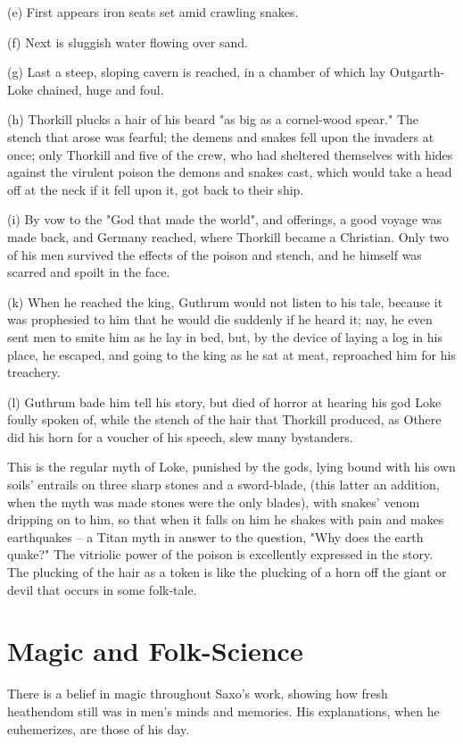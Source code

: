 \documentclass[10pt,a4paper]{report}
\begin{document}
(e) First appears iron seats set amid crawling snakes.

(f) Next is sluggish water flowing over sand.

(g) Last a steep, sloping cavern is reached, in a chamber of which lay Outgarth-Loke chained, huge and foul.

(h) Thorkill plucks a hair of his beard "as big as a cornel-wood spear." The stench that arose was fearful; the demens and snakes fell upon the invaders at once; only Thorkill and five of the crew, who had sheltered themselves with hides against the virulent poison the demons and snakes cast, which would take a head off at the neck if it fell upon it, got back to their ship.

(i) By vow to the "God that made the world", and offerings, a good voyage was made back, and Germany reached, where Thorkill became a Christian. Only two of his men survived the effects of the poison and stench, and he himself was scarred and spoilt in the face.

(k) When he reached the king, Guthrum would not listen to his tale, because it was prophesied to him that he would die suddenly if he heard it; nay, he even sent men to smite him as he lay in bed, but, by the device of laying a log in his place, he escaped, and going to the king as he sat at meat, reproached him for his treachery.

(l) Guthrum bade him tell his story, but died of horror at hearing his god Loke foully spoken of, while the stench of the hair that Thorkill produced, as Othere did his horn for a voucher of his speech, slew many bystanders.

This is the regular myth of Loke, punished by the gods, lying bound with his own soils' entrails on three sharp stones and a sword-blade, (this latter an addition, when the myth was made stones were the only blades), with snakes' venom dripping on to him, so that when it falls on him he shakes with pain and makes earthquakes  -- a Titan myth in answer to the question, "Why does the earth quake?" The vitriolic power of the poison is excellently expressed in the story. The plucking of the hair as a token is like the plucking of a horn off the giant or devil that occurs in some folk-tale.


\chapter{Magic and Folk-Science}

There is a belief in magic throughout Saxo's work, showing how fresh heathendom still was in men's minds and memories. His explanations, when he euhemerizes, are those of his day.
\end{document}
